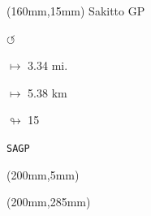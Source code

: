\begin{textblock*}{40mm}(160mm,15mm)%
Sakitto GP
\par \Huge$\circlearrowleft$
\Large
\par$\mapsto$ 3.34 mi.
\par$\mapsto$ 5.38 km
\par$\looparrowright$ 15
\par\hfill\tiny\tt SAGP\\
\end{textblock*}
\begin{textblock*}{20mm}(200mm,5mm)%
\fbox{\thepage}
\end{textblock*}
\begin{textblock*}{20mm}(200mm,285mm)%
\fbox{\thepage}
\end{textblock*}
\null\newpage

